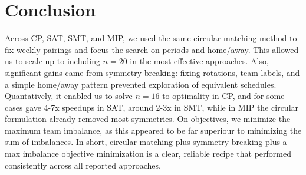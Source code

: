\section{Conclusion}

Across CP, SAT, SMT, and MIP, we used the same circular matching method to fix weekly pairings and focus the search on periods and home/away.
This allowed us to scale up to including $n = 20$ in the most effective approaches.
Also, significant gains came from symmetry breaking: fixing rotations, team labels, and a simple home/away pattern prevented exploration of equivalent schedules.
Quantatively, it enabled us to solve $n=16$ to optimality in CP, and for some cases gave 4-7x speedups in SAT, around 2-3x in SMT, while in MIP the circular formulation already removed most symmetries.
On objectives, we minimize the maximum team imbalance, as this appeared to be far superiour to minimizing the sum of imbalances.
In short, circular matching plus symmetry breaking plus a max imbalance objective minimization is a clear, reliable recipe that performed consistently across all reported approaches. 
